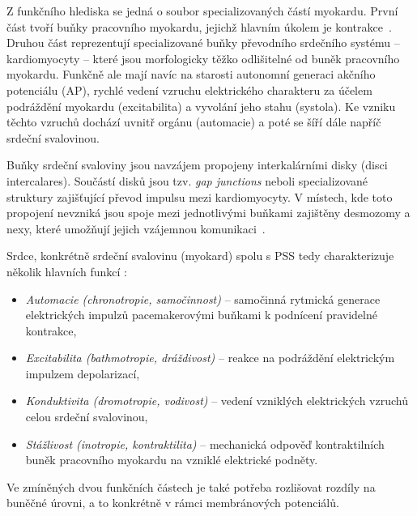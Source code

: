 Z funkčního hlediska se jedná o soubor specializovaných částí myokardu. První
část tvoří buňky pracovního myokardu, jejichž hlavním úkolem je
kontrakce~\cite{Cihak2016}. Druhou část reprezentují specializované buňky
převodního srdečního systému -- kardiomyocyty -- které jsou morfologicky těžko
odlišitelné od buněk pracovního myokardu. Funkčně ale mají navíc na starosti
autonomní generaci akčního potenciálu (AP), rychlé vedení vzruchu elektrického
charakteru za účelem podráždění myokardu (excitabilita) a vyvolání jeho stahu
(systola). Ke vzniku těchto vzruchů dochází uvnitř orgánu (automacie) a poté se
šíří dále napříč srdeční svalovinou. 

Buňky srdeční svaloviny jsou navzájem propojeny interkalárními disky (disci
intercalares). Součástí disků jsou tzv. \textit{gap junctions} neboli
specializované struktury zajišťující převod impulsu mezi kardiomyocyty. V
místech, kde toto propojení nevzniká jsou spoje mezi jednotlivými buňkami
zajištěny desmozomy a nexy, které umožňují jejich vzájemnou
komunikaci~\cite{Dylevsky2013, Stejfa2006}.

Srdce, konkrétně srdeční svalovinu (myokard) spolu s PSS tedy charakterizuje
několik hlavních funkcí \cite{Stejfa2006}:
\begin{itemize}
	\item \textit{Automacie (chronotropie, samočinnost)} -- samočinná rytmická
	      generace elektrických impulzů pacemakerovými buňkami k podnícení
	      pravidelné kontrakce,
	\item \textit{Excitabilita (bathmotropie, dráždivost)} -- reakce na
	      podráždění elektrickým impulzem depolarizací,
	\item \textit{Konduktivita (dromotropie, vodivost)} -- vedení vzniklých
	      elektrických vzruchů celou srdeční svalovinou,
	\item \textit{Stážlivost (inotropie, kontraktilita)} -- mechanická odpověď
	      kontraktilních buněk pracovního myokardu na vzniklé elektrické
	      podněty.
\end{itemize}

Ve zmíněných dvou funkčních částech je také potřeba rozlišovat rozdíly na
buněčné úrovni, a to konkrétně v rámci membránových potenciálů. 

